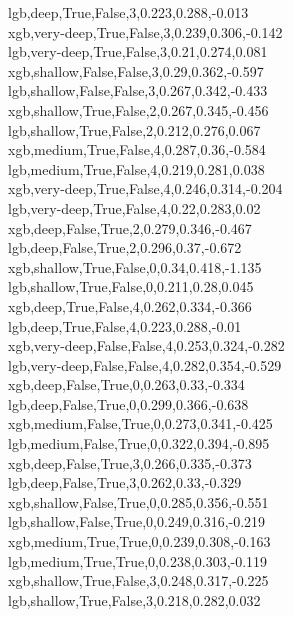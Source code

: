 lgb,deep,True,False,3,0.223,0.288,-0.013 \\
xgb,very-deep,True,False,3,0.239,0.306,-0.142 \\
lgb,very-deep,True,False,3,0.21,0.274,0.081 \\
xgb,shallow,False,False,3,0.29,0.362,-0.597 \\
lgb,shallow,False,False,3,0.267,0.342,-0.433 \\
xgb,shallow,True,False,2,0.267,0.345,-0.456 \\
lgb,shallow,True,False,2,0.212,0.276,0.067 \\
xgb,medium,True,False,4,0.287,0.36,-0.584 \\
lgb,medium,True,False,4,0.219,0.281,0.038 \\
xgb,very-deep,True,False,4,0.246,0.314,-0.204 \\
lgb,very-deep,True,False,4,0.22,0.283,0.02 \\
xgb,deep,False,True,2,0.279,0.346,-0.467 \\
lgb,deep,False,True,2,0.296,0.37,-0.672 \\
xgb,shallow,True,False,0,0.34,0.418,-1.135 \\
lgb,shallow,True,False,0,0.211,0.28,0.045 \\
xgb,deep,True,False,4,0.262,0.334,-0.366 \\
lgb,deep,True,False,4,0.223,0.288,-0.01 \\
xgb,very-deep,False,False,4,0.253,0.324,-0.282 \\
lgb,very-deep,False,False,4,0.282,0.354,-0.529 \\
xgb,deep,False,True,0,0.263,0.33,-0.334 \\
lgb,deep,False,True,0,0.299,0.366,-0.638 \\
xgb,medium,False,True,0,0.273,0.341,-0.425 \\
lgb,medium,False,True,0,0.322,0.394,-0.895 \\
xgb,deep,False,True,3,0.266,0.335,-0.373 \\
lgb,deep,False,True,3,0.262,0.33,-0.329 \\
xgb,shallow,False,True,0,0.285,0.356,-0.551 \\
lgb,shallow,False,True,0,0.249,0.316,-0.219 \\
xgb,medium,True,True,0,0.239,0.308,-0.163 \\
lgb,medium,True,True,0,0.238,0.303,-0.119 \\
xgb,shallow,True,False,3,0.248,0.317,-0.225 \\
lgb,shallow,True,False,3,0.218,0.282,0.032 \\
